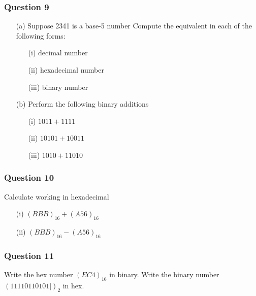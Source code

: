 \documentclass[]{report}
\begin{document}
	
	
	\subsubsection*{Question 9}
	
	\begin{itemize}
		\item[(a)] Suppose 2341 is a base-5 number
		Compute the equivalent in each of the following forms:
		\begin{itemize}
			\item[(i)] decimal number
			\item[(ii)] hexadecimal number
			\item[(iii)] binary number
		\end{itemize}
		\item[(b)] Perform the following binary additions
		\begin{itemize}
			\item[(i)] $1011+ 1111$
			\item[(ii)] $10101  + 10011$
			\item[(iii)] $1010 + 11010$
		\end{itemize}
	\end{itemize}
	
	\subsubsection*{Question 10}
	
	Calculate working in hexadecimal
	\begin{itemize}
		\item[(i)] $(BBB)_{16} + (A56)_{16}$
		\item[(ii)] $(BBB)_{16} - (A56)_{16}$
	\end{itemize} 
	
	
	\subsubsection*{Question 11}
	
	Write the hex number $(EC4)_{16}$ in binary.
	Write the binary number $(11110110101|)_2$ in hex.
\end{document}
